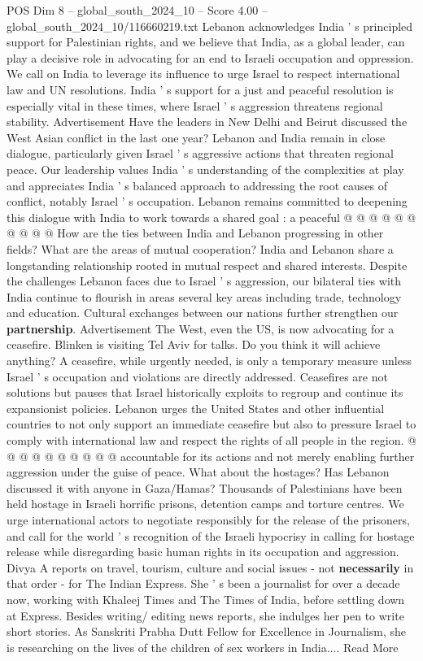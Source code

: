 \begin{textsample}{POS Dim 8 – global\_south\_2024\_10 – Score 4.00 – global\_south\_2024\_10/116660219.txt}
Lebanon acknowledges India ' s principled support for Palestinian rights, and we believe that India, as a global leader, can play a decisive role in advocating for an end to Israeli occupation and oppression.
We call on India to leverage its influence to urge Israel to respect international law and UN resolutions.
India ' s support for a just and peaceful resolution is especially vital in these times, where Israel ' s aggression threatens regional stability.
Advertisement Have the leaders in New Delhi and Beirut discussed the West Asian conflict in the last one year?
Lebanon and India remain in close dialogue, particularly given Israel ' s aggressive actions that threaten regional peace.
Our leadership values India ' s understanding of the complexities at play and appreciates India ' s balanced approach to addressing the root causes of conflict, notably Israel ' s occupation.
Lebanon remains committed to deepening this dialogue with India to work towards a shared goal : a peaceful @ @ @ @ @ @ @ @ @ @ How are the ties between India and Lebanon progressing in other fields?
What are the areas of mutual cooperation?
India and Lebanon share a longstanding relationship rooted in mutual respect and shared interests.
Despite the challenges Lebanon faces due to Israel ' s aggression, our bilateral ties with India continue to flourish in areas several key areas including trade, technology and education.
Cultural exchanges between our nations further strengthen our \textbf{partnership}.
Advertisement The West, even the US, is now advocating for a ceasefire.
Blinken is visiting Tel Aviv for talks.
Do you think it will achieve anything?
A ceasefire, while urgently needed, is only a temporary measure unless Israel ' s occupation and violations are directly addressed.
Ceasefires are not solutions but pauses that Israel historically exploits to regroup and continue its expansionist policies.
Lebanon urges the United States and other influential countries to not only support an immediate ceasefire but also to pressure Israel to comply with international law and respect the rights of all people in the region. @ @ @ @ @ @ @ @ @ @ accountable for its actions and not merely enabling further aggression under the guise of peace.
What about the hostages?
Has Lebanon discussed it with anyone in Gaza/Hamas?
Thousands of Palestinians have been held hostage in Israeli horrific prisons, detention camps and torture centres.
We urge international actors to negotiate responsibly for the release of the prisoners, and call for the world ' s recognition of the Israeli hypocrisy in calling for hostage release while disregarding basic human rights in its occupation and aggression.
Divya A reports on travel, tourism, culture and social issues - not \textbf{necessarily} in that order - for The Indian Express.
She ' s been a journalist for over a decade now, working with Khaleej Times and The Times of India, before settling down at Express.
Besides writing/ editing news reports, she indulges her pen to write short stories.
As Sanskriti Prabha Dutt Fellow for Excellence in Journalism, she is researching on the lives of the children of sex workers in India....
Read More


\end{textsample}
